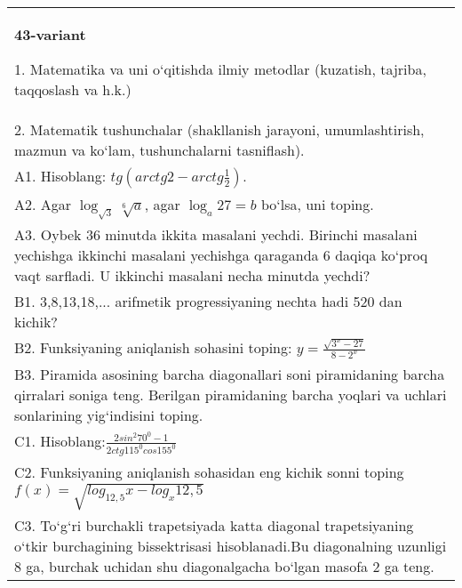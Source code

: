 \documentclass{article}
\begin{document}
\begin{tabular}{m{17cm}}
\textbf{43-variant}

1. Matematika va uni o‘qitishda ilmiy metodlar (kuzatish, tajriba, taqqoslash va h.k.) \\
2. Matematik tushunchalar (shakllanish jarayoni, umumlashtirish, mazmun va ko‘lam, tushunchalarni tasniflash). \\
A1. Hisoblang: \(tg\left (arctg2 - arctg\frac{1}{2} \right) \). \\
A2. Agar \(\log_{\sqrt{3}}\sqrt[6]{a}\), agar \(\log_{a}27 = b\) bo‘lsa, uni toping. \\
A3. Oybek 36 minutda ikkita masalani yechdi. Birinchi masalani yechishga ikkinchi masalani yechishga qaraganda 6 daqiqa ko‘proq vaqt sarfladi. U ikkinchi masalani necha minutda yechdi? \\
B1. 3,8,13,18,... arifmetik progressiyaning nechta hadi 520 dan kichik? \\
B2. Funksiyaning aniqlanish sohasini toping: \(y = \frac{\sqrt{3^{x} - 27}}{8 - 2^{x}}\) \\
B3. Piramida asosining barcha diagonallari soni piramidaning barcha qirralari soniga teng. Berilgan piramidaning barcha yoqlari va uchlari sonlarining yig‘indisini toping. \\
C1. Hisoblang:\(\frac{2sin^{2}70^{0} - 1}{2ctg115^{0}cos155^{0}}\) \\
C2. Funksiyaning aniqlanish sohasidan eng kichik sonni toping \(f (x) = \sqrt{log_{12,5}x - log_{x}12,5}\) \\
C3. To‘g‘ri burchakli trapetsiyada katta diagonal trapetsiyaning o‘tkir burchagining bissektrisasi hisoblanadi.Bu diagonalning uzunligi 8 ga, burchak uchidan shu diagonalgacha bo‘lgan masofa 2 ga teng. \\

\end{tabular}
\vspace{1cm}
\end{document}
